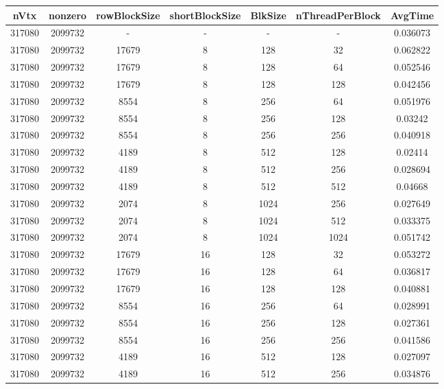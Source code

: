 \documentclass[9pt]{article}
\begin{document}
\SetBgPosition{0.25cm,-5.0cm}
\begin{tabular}{|c|c|c|c|c|c|c| }  
\hline
nVtx  & nonzero  & rowBlockSize  & shortBlockSize  & BlkSize  & nThreadPerBlock  & AvgTime \\
\hline
317080  & 2099732  &  -  & -  & -  & -  &0.036073 \\
\hline
317080  & 2099732  & 17679  & 8  & 128  & 32  & 0.062822 \\
\hline
317080  & 2099732  & 17679  & 8  & 128  & 64  & 0.052546 \\
\hline
317080  & 2099732  & 17679  & 8  & 128  & 128  & 0.042456 \\
\hline
317080  & 2099732  & 8554  & 8  & 256  & 64  & 0.051976 \\
\hline
317080  & 2099732  & 8554  & 8  & 256  & 128  & 0.03242 \\
\hline
317080  & 2099732  & 8554  & 8  & 256  & 256  & 0.040918 \\
\hline
317080  & 2099732  & 4189  & 8  & 512  & 128  & 0.02414 \\
\hline
317080  & 2099732  & 4189  & 8  & 512  & 256  & 0.028694 \\
\hline
317080  & 2099732  & 4189  & 8  & 512  & 512  & 0.04668 \\
\hline
317080  & 2099732  & 2074  & 8  & 1024  & 256  & 0.027649 \\
\hline
317080  & 2099732  & 2074  & 8  & 1024  & 512  & 0.033375 \\
\hline
317080  & 2099732  & 2074  & 8  & 1024  & 1024  & 0.051742 \\
\hline
317080  & 2099732  & 17679  & 16  & 128  & 32  & 0.053272 \\
\hline
317080  & 2099732  & 17679  & 16  & 128  & 64  & 0.036817 \\
\hline
317080  & 2099732  & 17679  & 16  & 128  & 128  & 0.040881 \\
\hline
317080  & 2099732  & 8554  & 16  & 256  & 64  & 0.028991 \\
\hline
317080  & 2099732  & 8554  & 16  & 256  & 128  & 0.027361 \\
\hline
317080  & 2099732  & 8554  & 16  & 256  & 256  & 0.041586 \\
\hline
317080  & 2099732  & 4189  & 16  & 512  & 128  & 0.027097 \\
\hline
317080  & 2099732  & 4189  & 16  & 512  & 256  & 0.034876 \\

\end{tabular}
\end{document}
